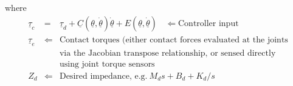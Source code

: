 \documentclass[]{article}
\begin{document}
where
\begin{eqnarray}
 \underline{\tau}_{c} & = & \underline{\tau}_{d} + \underline{C}(\underline{\theta}, \underline{\dot{\theta}})\underline{\dot{\theta}} + E(\underline{\theta}, \underline{\dot{\theta}})\ \ \ \  \Leftarrow \text{Controller input}\nonumber \\ 
 \underline{\tau}_{e} & \Leftarrow & \text{Contact torques (either contact forces evaluated at the joints} \nonumber \\
 && \text{via the Jacobian transpose relationship, or sensed directly} \nonumber \\
 && \text{using joint torque sensors} \nonumber \\
 Z_{d} & \Leftarrow & \text{Desired impedance, e.g.}\  M_{d}s+B_{d}+K_{d}/s \nonumber
\end{eqnarray}
\end{document}
